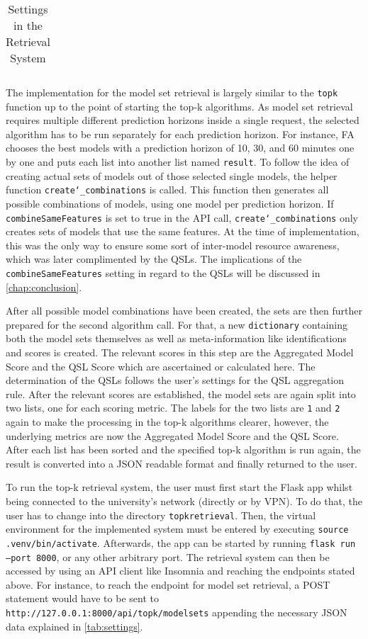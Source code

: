 \begin{table}[h]
\begin{tabular}{  l  p{7cm}  p{3cm} }
        \bottomrule
    \end{tabular}
\caption{Settings in the Retrieval System} \label{tab:settings}
\end{table}


The implementation for the model set retrieval is largely similar to the \texttt{topk} function up to the point of starting the top-k algorithms. As model set retrieval requires multiple different prediction horizons inside a single request, the selected algorithm has to be run separately for each prediction horizon. For instance, FA chooses the best models with a prediction horizon of 10, 30, and 60 minutes one by one and puts each list into another list named \texttt{result}. To follow the idea of creating actual sets of models out of those selected single models, the helper function \texttt{create\char`_combinations} is called. This function then generates all possible combinations of models, using one model per prediction horizon. If \texttt{combineSameFeatures} is set to true in the API call, \texttt{create\char`_combinations} only creates sets of models that use the same features. At the time of implementation, this was the only way to ensure some sort of inter-model resource awareness, which was later complimented by the QSLs. The implications of the \texttt{combineSameFeatures} setting in regard to the QSLs will be discussed in \autoref{chap:conclusion}.

After all possible model combinations have been created, the sets are then further prepared for the second algorithm call. For that, a new \texttt{dictionary} containing both the model sets themselves as well as meta-information like identifications and scores is created. The relevant scores in this step are the Aggregated Model Score and the QSL Score which are ascertained or calculated here. The determination of the QSLs follows the user's settings for the QSL aggregation rule. After the relevant scores are established, the model sets are again split into two lists, one for each scoring metric. The labels for the two lists are \texttt{1} and \texttt{2} again to make the processing in the top-k algorithms clearer, however, the underlying metrics are now the Aggregated Model Score and the QSL Score. After each list has been sorted and the specified top-k algorithm is run again, the result is converted into a JSON readable format and finally returned to the user.

To run the top-k retrieval system, the user must first start the Flask app whilst being connected to the university's network (directly or by VPN). To do that, the user has to change into the directory \texttt{topkretrieval}. Then, the virtual environment for the implemented system must be entered by executing \texttt{source .venv/bin/activate}. Afterwards, the app can be started by running \texttt{flask run --port 8000}, or any other arbitrary port. The retrieval system can then be accessed by using an API client like Insomnia and reaching the endpoints stated above. For instance, to reach the endpoint for model set retrieval, a POST statement would have to be sent to \texttt{http://127.0.0.1:8000/api/topk/modelsets} appending the necessary JSON data explained in \autoref{tab:settings}.

